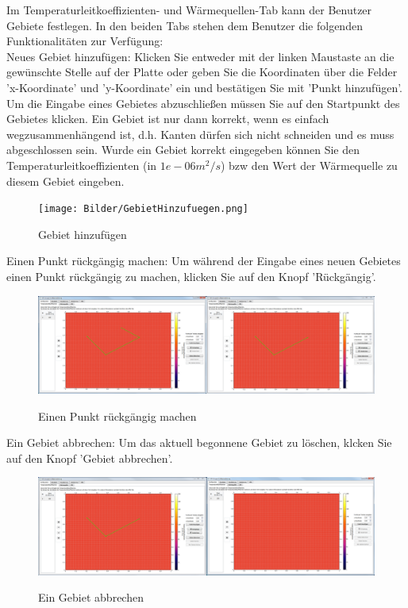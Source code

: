 \newpage
\noindent
Im Temperaturleitkoeffizienten- und Wärmequellen-Tab kann der Benutzer Gebiete festlegen. In den beiden Tabs stehen dem Benutzer die folgenden Funktionalitäten zur Verfügung:\\


\noindent
Neues Gebiet hinzufügen:
Klicken Sie entweder mit der linken Maustaste an die gewünschte Stelle auf der Platte oder geben Sie die Koordinaten über die Felder 'x-Koordinate' und 'y-Koordinate' ein und bestätigen Sie mit 'Punkt hinzufügen'. Um die Eingabe eines Gebietes abzuschließen müssen Sie auf den Startpunkt des Gebietes klicken. Ein Gebiet ist nur dann korrekt, wenn es einfach wegzusammenhängend ist, d.h. Kanten dürfen sich nicht schneiden und es muss abgeschlossen sein. Wurde ein Gebiet korrekt eingegeben können Sie den Temperaturleitkoeffizienten (in $1e-06 m^2/s$) bzw den Wert der Wärmequelle zu diesem Gebiet eingeben.
\begin{figure}[H]
\centering
\texttt{[image: Bilder/GebietHinzufuegen.png]}\\
\caption{Gebiet hinzufügen}
\label{Ein neues Gebiet hinzufügen}
\end{figure}

\newpage
\noindent
Einen Punkt rückgängig machen:
Um während der Eingabe eines neuen Gebietes einen Punkt rückgängig zu machen, klicken Sie auf den Knopf 'Rückgängig'.
\begin{figure}[H]
\centering
\includegraphics[scale=.25]{Bilder/PunktRueckgaengig.png}\\
\caption{Einen Punkt rückgängig machen}
\label{PunktRueckgaengig}
\end{figure}

\noindent
Ein Gebiet abbrechen: Um das aktuell begonnene Gebiet zu löschen, klcken Sie auf den Knopf 'Gebiet abbrechen'.
\begin{figure}[H]
\centering
\includegraphics[scale=.25]{Bilder/GebietAbbrechen.png}\\
\caption{Ein Gebiet abbrechen}
\label{GebietAbbrechen}
\end{figure}

